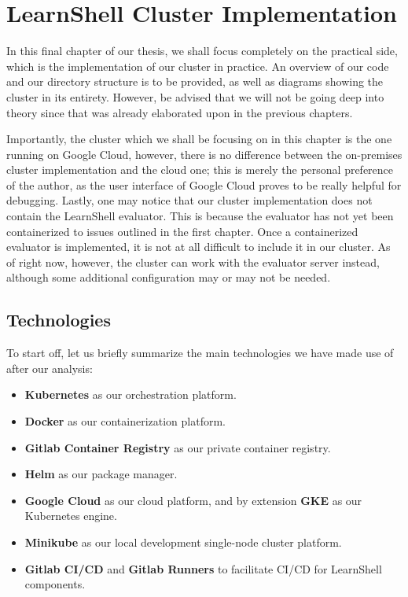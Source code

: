 \documentclass[thesis=B,english]{FITthesis}[2019/12/23]
\begin{document}
\chapter{LearnShell Cluster Implementation}

In this final chapter of our thesis, we shall focus completely on the practical side, which is the implementation of our cluster in practice. An overview of our code and our directory structure is to be provided, as well as diagrams showing the cluster in its entirety. However, be advised that we will not be going deep into theory since that was already elaborated upon in the previous chapters.

Importantly, the cluster which we shall be focusing on in this chapter is the one running on Google Cloud, however, there is no difference between the on-premises cluster implementation and the cloud one; this is merely the personal preference of the author, as the user interface of Google Cloud proves to be really helpful for debugging. Lastly, one may notice that our cluster implementation does not contain the LearnShell evaluator. This is because the evaluator has not yet been containerized to issues outlined in the first chapter. Once a containerized evaluator is implemented, it is not at all difficult to include it in our cluster. As of right now, however, the cluster can work with the evaluator server instead, although some additional configuration may or may not be needed.

\section{Technologies}

To start off, let us briefly summarize the main technologies we have made use of after our analysis:

\begin{itemize}
  \setlength\itemsep{0em}
  \item \textbf{Kubernetes} as our orchestration platform.
  \item \textbf{Docker} as our containerization platform.
  \item \textbf{Gitlab Container Registry} as our private container registry.
  \item \textbf{Helm} as our package manager.
  \item \textbf{Google Cloud} as our cloud platform, and by extension \textbf{GKE} as our Kubernetes engine.
  \item \textbf{Minikube} as our local development single-node cluster platform.
  \item \textbf{Gitlab CI/CD} and \textbf{Gitlab Runners} to facilitate CI/CD for LearnShell components.
\end{itemize}
\end{document}
